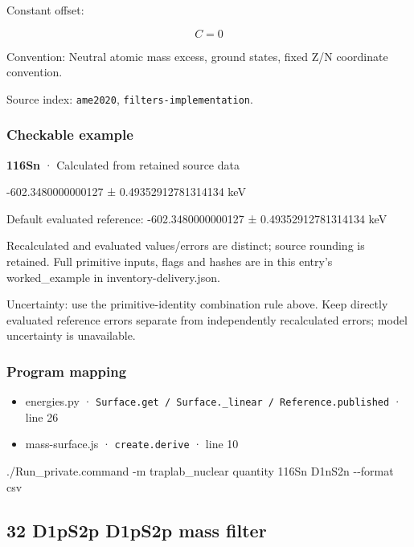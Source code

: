 \documentclass[
  11pt,
  letterpaper,
]{article}
\newenvironment{Shaded}{}{}
\newcommand{\AttributeTok}[1]{\textcolor[rgb]{0.49,0.56,0.16}{#1}}
\newcommand{\ExtensionTok}[1]{#1}
\newcommand{\NormalTok}[1]{#1}
\providecommand{\tightlist}{%
  \setlength{\itemsep}{0pt}\setlength{\parskip}{0pt}}
\begin{document}
Constant offset:

\[
C=0
\]

Convention: Neutral atomic mass excess, ground states, fixed Z/N
coordinate convention.

Source index: \texttt{ame2020}, \texttt{filters-implementation}.

\subsubsection{Checkable example}\label{checkable-example-30}

\textbf{116Sn} · Calculated from retained source data

-602.3480000000127 ± 0.49352912781314134 keV

Default evaluated reference: -602.3480000000127 ± 0.49352912781314134
keV

Recalculated and evaluated values/errors are distinct; source rounding
is retained. Full primitive inputs, flags and hashes are in this entry's
worked\_example in inventory-delivery.json.

Uncertainty: use the primitive-identity combination rule above. Keep
directly evaluated reference errors separate from independently
recalculated errors; model uncertainty is unavailable.

\subsubsection{Program mapping}\label{program-mapping-30}

\begin{itemize}
\tightlist
\item
  energies.py ·
  \texttt{Surface.get\ /\ Surface.\_linear\ /\ Reference.published} ·
  line 26
\item
  mass-surface.js · \texttt{create.derive} · line 10
\end{itemize}

\begin{Shaded}
\begin{Highlighting}[]
\ExtensionTok{./Run\_private.command} \AttributeTok{{-}m}\NormalTok{ traplab\_nuclear quantity 116Sn D1nS2n }\AttributeTok{{-}{-}format}\NormalTok{ csv}
\end{Highlighting}
\end{Shaded}

\subsection{32 D1pS2p D1pS2p mass
filter}\label{d1ps2p-d1ps2p-mass-filter}
\end{document}
